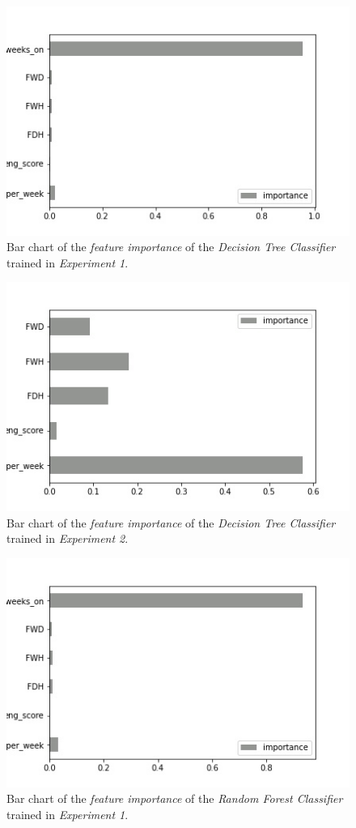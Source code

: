 \documentclass[sigplan,screen]{acmart}
\begin{document}
 \begin{figure}[h]
     \centering
     \includegraphics[width=0.5\linewidth]{reports/figures/feature_importance_dc_1.jpg}
     \caption{Bar chart of the \emph{feature importance} of the \emph{Decision Tree Classifier} trained in \emph{Experiment 1}.}
     \label{fig:fi_dc_1}
 \end{figure}
 
 \begin{figure}[h]
     \centering
     \includegraphics[width=0.5\linewidth]{reports/figures/feature_importance_dc_2.jpg}
     \caption{Bar chart of the \emph{feature importance} of the \emph{Decision Tree Classifier} trained in \emph{Experiment 2}.}
     \label{fig:fi_dc_2}
 \end{figure}

 \begin{figure}[h]
     \centering
     \includegraphics[width=0.5\linewidth]{reports/figures/feature_importance_rf_1.jpg}
     \caption{Bar chart of the \emph{feature importance} of the \emph{Random Forest Classifier} trained in \emph{Experiment 1}.}
     \label{fig:fi_rf_1}
 \end{figure}
 
\end{document}
